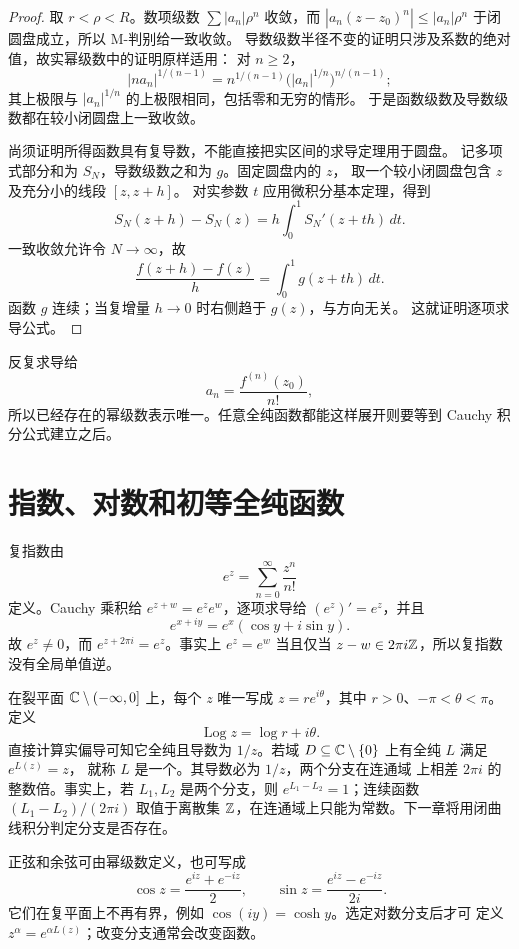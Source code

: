 \begin{proof}
取 \(r<\rho<R\)。数项级数 \(\sum|a_n|\rho^n\) 收敛，而
\(|a_n(z-z_0)^n|\le|a_n|\rho^n\) 于闭圆盘成立，所以 M-判别给一致收敛。
导数级数半径不变的证明只涉及系数的绝对值，故实幂级数中的证明原样适用：
对 \(n\ge2\)，
\[
 |na_n|^{1/(n-1)}
 =n^{1/(n-1)}\bigl(|a_n|^{1/n}\bigr)^{n/(n-1)};
\]
其上极限与 \(|a_n|^{1/n}\) 的上极限相同，包括零和无穷的情形。
于是函数级数及导数级数都在较小闭圆盘上一致收敛。

尚须证明所得函数具有复导数，不能直接把实区间的求导定理用于圆盘。
记多项式部分和为 \(S_N\)，导数级数之和为 \(g\)。固定圆盘内的 \(z\)，
取一个较小闭圆盘包含 \(z\) 及充分小的线段 \([z,z+h]\)。
对实参数 \(t\) 应用微积分基本定理，得到
\[
 S_N(z+h)-S_N(z)=h\int_0^1S_N'(z+th)\,dt.
\]
一致收敛允许令 \(N\to\infty\)，故
\[
 \frac{f(z+h)-f(z)}h=\int_0^1g(z+th)\,dt.
\]
函数 \(g\) 连续；当复增量 \(h\to0\) 时右侧趋于 \(g(z)\)，与方向无关。
这就证明逐项求导公式。
\end{proof}

反复求导给
\[
 a_n=\frac{f^{(n)}(z_0)}{n!},
\]
所以已经存在的幂级数表示唯一。任意全纯函数都能这样展开则要等到
Cauchy 积分公式建立之后。

\section{指数、对数和初等全纯函数}

复指数由
\[
 e^z=\sum_{n=0}^{\infty}\frac{z^n}{n!}
\]
定义。Cauchy 乘积给 \(e^{z+w}=e^ze^w\)，逐项求导给
\((e^z)'=e^z\)，并且
\[
 e^{x+iy}=e^x(\cos y+i\sin y).
\]
故 \(e^z\ne0\)，而 \(e^{z+2\pi i}=e^z\)。事实上
\(e^z=e^w\) 当且仅当 \(z-w\in2\pi i\mathbb{Z}\)，所以复指数没有全局单值逆。

在裂平面 \(\mathbb{C}\setminus(-\infty,0]\) 上，每个 \(z\) 唯一写成
\(z=re^{i\theta}\)，其中 \(r>0\)、\(-\pi<\theta<\pi\)。定义
\[
 \operatorname{Log}z=\log r+i\theta.
\]
直接计算实偏导可知它全纯且导数为 \(1/z\)。若域
\(D\subseteq\mathbb{C}\setminus\{0\}\) 上有全纯 \(L\) 满足 \(e^{L(z)}=z\)，
就称 \(L\) 是一个。其导数必为 \(1/z\)，两个分支在连通域
上相差 \(2\pi i\) 的整数倍。事实上，若 \(L_1,L_2\) 是两个分支，则
\(e^{L_1-L_2}=1\)；连续函数 \((L_1-L_2)/(2\pi i)\) 取值于离散集
\(\mathbb{Z}\)，在连通域上只能为常数。下一章将用闭曲线积分判定分支是否存在。

正弦和余弦可由幂级数定义，也可写成
\[
 \cos z=\frac{e^{iz}+e^{-iz}}2,\qquad
 \sin z=\frac{e^{iz}-e^{-iz}}{2i}.
\]
它们在复平面上不再有界，例如 \(\cos(iy)=\cosh y\)。选定对数分支后才可
定义 \(z^\alpha=e^{\alpha L(z)}\)；改变分支通常会改变函数。

